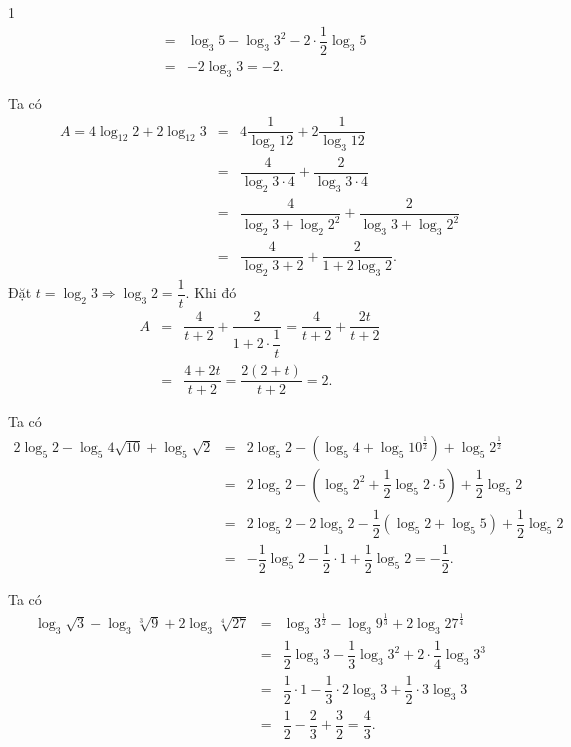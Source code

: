 \begin{vd}
{\begin{enumEX}[\hspace*{.5cm}a)]{1}
\begin{eqnarray*}
				&=&\log _{3} 5-\log _{3} 3^2-2\cdot \dfrac{1}{2} \log _{3} 5\\
				&=&-2\log _{3} 3=-2
				.
			\end{eqnarray*}
			\item Ta có \allowdisplaybreaks
			\begin{eqnarray*}
				A=4 \log _{12} 2+2 \log _{12} 3&=&4 \dfrac{1}{\log _2 12}+2 \dfrac{1}{\log _3 12}\\
				&=& \dfrac{4}{\log _2 3\cdot 4}+ \dfrac{2}{\log _3 3\cdot 4}\\
				&=& \dfrac{4}{\log _2 3+\log _2 2^2}+ \dfrac{2}{\log _3 3+\log _3 2^2}\\
				&=& \dfrac{4}{\log _2 3+2}+ \dfrac{2}{1+2\log _3 2}.
			\end{eqnarray*}
			Đặt $t=\log _2 3\Rightarrow \log _3 2=\dfrac{1}{t}$. Khi đó
			\begin{eqnarray*}
				A&=& \dfrac{4}{t+2}+ \dfrac{2}{1+2\cdot  \dfrac{1}{t}}=\dfrac{4}{t+2}+ \dfrac{2t}{t+2}\\&=&\dfrac{4+2t}{t+2}=\dfrac{2(2+t)}{t+2}=2.
			\end{eqnarray*}
			
			\item Ta có \allowdisplaybreaks
			\begin{eqnarray*}
				2 \log _{5} 2-\log _{5} 4 \sqrt{10}+\log _{5} \sqrt{2}&=&2 \log _{5} 2-\left(\log _{5} 4 +\log _{5} 10^{\tfrac{1}{2}}\right)+\log _{5} 2^{\tfrac{1}{2}}\\
				&=&2 \log _{5} 2-\left(\log _{5} 2^2 +\dfrac{1}{2}\log _{5} 2\cdot 5\right)+\dfrac{1}{2}\log _{5} 2\\
				&=&2 \log _{5} 2-2\log _{5} 2 -\dfrac{1}{2}\left(\log _{5} 2+\log _{5} 5\right)+\dfrac{1}{2}\log _{5} 2\\
				&=&-\dfrac{1}{2}\log _{5} 2-\dfrac{1}{2}\cdot 1+\dfrac{1}{2}\log _{5} 2=-\dfrac{1}{2}.
			\end{eqnarray*}
			\item Ta có \allowdisplaybreaks
			\begin{eqnarray*}
				\log _{3} \sqrt{3}-\log _{3} \sqrt[3]{9}+2 \log _{3} \sqrt[4]{27}&=&\log _{3} 3^{\tfrac{1}{2}}-\log _{3} 9^{\tfrac{1}{3}}+2 \log _{3} 27^{\tfrac{1}{4}}\\&=&\dfrac{1}{2}\log _{3} 3-\dfrac{1}{3}\log _{3} 3^2+2\cdot \dfrac{1}{4} \log _{3} 3^3\\
				&=&\dfrac{1}{2}\cdot 1-\dfrac{1}{3}\cdot  2\log _{3} 3+ \dfrac{1}{2}\cdot 3 \log _{3} 3\\
				&=&\dfrac{1}{2}-\dfrac{2}{3}+ \dfrac{3}{2}=\dfrac{4}{3}
				.
			\end{eqnarray*}
\end{enumEX} }
\end{vd} 

